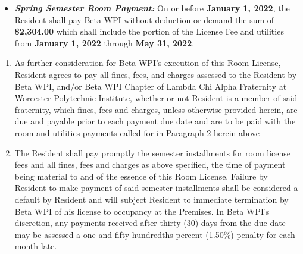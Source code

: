 \documentclass[legalpaper, 12pt]{article} \usepackage{lease}
\begin{document}
\begin{enumerate}
\begin{itemize}
                        \item \textbf{\textit{Spring Semester Room Payment:}} On
                                or before \textbf{January 1, 2022}, the Resident
                                shall pay Beta WPI without deduction or demand
                                the sum of \textbf{\$2,304.00} which shall
                                include the portion of the License Fee and
                                utilities from \textbf{January 1, 2022} through
                                \textbf{May 31, 2022}.

        \end{itemize}

        \begin{enumerate}[label=\Alph*.] 

                \item As further consideration for Beta WPI’s execution of this
                        Room License, Resident agrees to pay all fines, fees,
                        and charges assessed to the Resident by Beta WPI, and/or
                        Beta WPI Chapter of Lambda Chi Alpha Fraternity at
                        Worcester Polytechnic Institute, whether or not Resident
                        is a member of said fraternity, which fines, fees and
                        charges, unless otherwise provided herein, are due and
                        payable prior to each payment due date and are to be
                        paid with the room and utilities payments called for in
                        Paragraph 2 herein above 

                \item The Resident shall pay promptly the semester installments
                        for room license fees and all fines, fees and charges as
                        above specified, the time of payment being material to
                        and of the essence of this Room License.  Failure by
                        Resident to make payment of said semester installments
                        shall be considered a default by Resident and will
                        subject Resident to immediate termination by Beta WPI of
                        his license to occupancy at the Premises.  In Beta WPI’s
                        discretion, any payments received after thirty (30) days
                        from the due date may be assessed a one and fifty
                        hundredths percent (1.50\%) penalty for each month late. 


\end{enumerate}
\end{enumerate}
\end{document}
